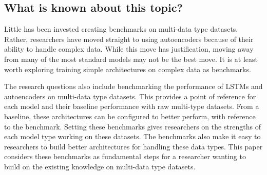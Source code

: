 \subsection{What is known about this topic?}

Little has been invested creating benchmarks on multi-data type datasets.  Rather, researchers have moved straight to using autoencoders because of their ability to handle complex data.  While this move has justification, moving away from many of the most standard models may not be the best move.  It is at least worth exploring training simple architectures on complex data as benchmarks.  

The research questions also include benchmarking the performance of LSTMs and autoencoders on multi-data type datasets.  This provides a point of reference for each model and their baseline performance with raw multi-type datasets.  From a baseline, these architectures can be configured to better perform, with reference to the benchmark.  Setting these benchmarks gives researchers on the strengths of each model type working on these datasets.  The benchmarks also make it easy to researchers to build better architectures for handling these data types.  This paper considers these benchmarks as fundamental steps for a researcher wanting to build on the existing knowledge on multi-data type datasets.


